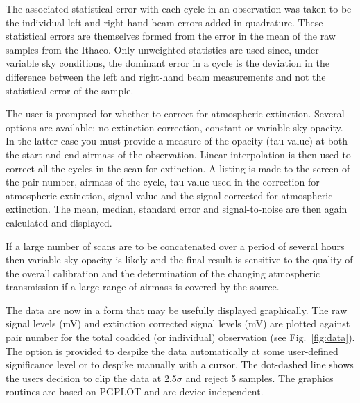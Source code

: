 \documentclass{article}
\begin{document}
The associated statistical error with each cycle in an observation was taken
to be the individual left and right-hand beam errors added in quadrature.
These statistical errors are themselves formed from the error in the mean of
the raw samples from the Ithaco.
Only unweighted statistics are
used since, under variable sky conditions, the dominant error in a cycle
is the deviation in the difference between the left and right-hand beam
measurements and not the statistical error of the sample.

 The user is prompted for whether to correct for
atmospheric extinction. Several options are available; no extinction
correction, constant or variable sky opacity. In the latter case you
must provide
a measure of the opacity (tau value) at both the start and end airmass of the
observation. Linear interpolation is then used to correct all the cycles in
the scan for extinction. A listing is made to the screen of the pair number,
airmass of the cycle, tau value used in the correction for atmospheric
extinction, signal value and the signal corrected for atmospheric extinction.
The mean, median, standard error and signal-to-noise are then again
calculated and displayed.

If a large number of scans are to be concatenated over a period of several
hours then variable sky opacity is likely and the final result is sensitive
to the quality of the overall calibration and the determination of the
changing atmospheric transmission if a large range of airmass is covered by
the source.

 The data are now in a form that may be usefully displayed
graphically. The raw signal levels (mV) and extinction corrected signal levels
(mV) are plotted against pair number for the total coadded (or individual)
observation (see Fig.~\ref{fig:data}).
The option is provided to despike the data automatically at some user-defined
significance level or to despike manually with a cursor.
The dot-dashed line shows the users decision to clip the data at
2.5$\sigma$ and reject 5 samples.
The graphics routines are based on PGPLOT and are device independent.
\end{document}
